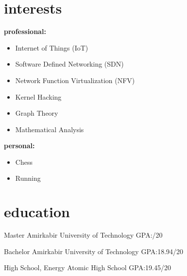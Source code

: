\documentclass[]{friggeri-cv} %
\begin{document}

\section{interests}
\textbf{professional:}
\begin{itemize}
	\item Internet of Things (IoT)
	\item Software Defined Networking (SDN)
	\item Network Function Virtualization (NFV)
	\item Kernel Hacking
	\item Graph Theory
	\item Mathematical Analysis
\end{itemize}
\textbf{personal:}
\begin{itemize}	
	\item Chess
	\item Running
\end{itemize}



\section{education}

\begin{entrylist}


	{Master }
	{Amirkabir University of Technology}
	{GPA:\@ /20}


	{Bachelor }
	{Amirkabir University of Technology}
	{GPA:\@ 18.94/20}


	{High School, }
	{Energy Atomic High School}
	{GPA:\@ 19.45/20}



\end{entrylist}
\pagebreak
\end{document}
